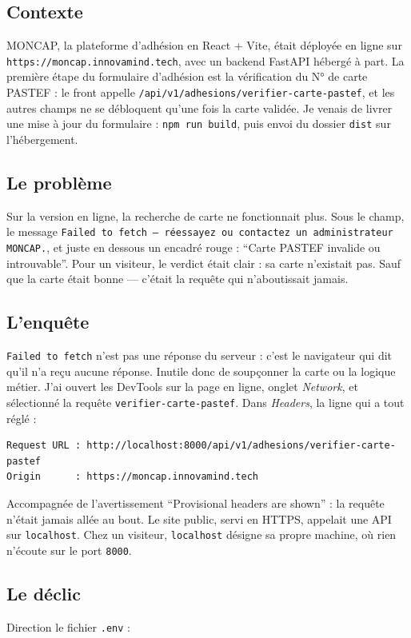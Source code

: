 \documentclass[10pt,twoside,openany]{article}
\begin{document}
\subsection*{Contexte}
MONCAP, la plateforme d'adhésion en React + Vite, était déployée en ligne sur \texttt{https://moncap.innovamind.tech}, avec un backend FastAPI hébergé à part. La première étape du formulaire d'adhésion est la vérification du N° de carte PASTEF : le front appelle \texttt{/api/v1/adhesions/verifier-carte-pastef}, et les autres champs ne se débloquent qu'une fois la carte validée. Je venais de livrer une mise à jour du formulaire : \texttt{npm run build}, puis envoi du dossier \texttt{dist} sur l'hébergement.

\subsection*{Le problème}
Sur la version en ligne, la recherche de carte ne fonctionnait plus. Sous le champ, le message \texttt{Failed to fetch --- réessayez ou contactez un administrateur MONCAP.}, et juste en dessous un encadré rouge : \enquote{Carte PASTEF invalide ou introuvable}. Pour un visiteur, le verdict était clair : sa carte n'existait pas. Sauf que la carte était bonne --- c'était la requête qui n'aboutissait jamais.

\subsection*{L'enquête}
\texttt{Failed to fetch} n'est pas une réponse du serveur : c'est le navigateur qui dit qu'il n'a reçu aucune réponse. Inutile donc de soupçonner la carte ou la logique métier. J'ai ouvert les DevTools sur la page en ligne, onglet \textit{Network}, et sélectionné la requête \texttt{verifier-carte-pastef}. Dans \textit{Headers}, la ligne qui a tout réglé :

\begin{lstlisting}
Request URL : http://localhost:8000/api/v1/adhesions/verifier-carte-pastef
Origin      : https://moncap.innovamind.tech
\end{lstlisting}

Accompagnée de l'avertissement \enquote{Provisional headers are shown} : la requête n'était jamais allée au bout. Le site public, servi en HTTPS, appelait une API sur \texttt{localhost}. Chez un visiteur, \texttt{localhost} désigne sa propre machine, où rien n'écoute sur le port \texttt{8000}.

\subsection*{Le déclic}
Direction le fichier \texttt{.env} :
\end{document}

